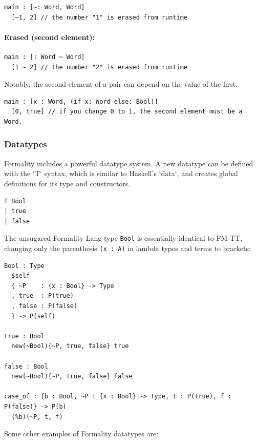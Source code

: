 \documentclass{article}
\theoremstyle{definition}
\theoremstyle{theorem}
\begin{document}
\begin{lstlisting}
main : [~: Word, Word]
  [~1, 2] // the number "1" is erased from runtime
\end{lstlisting}

\paragraph{Erased (second element):}

\begin{lstlisting}
main : [: Word ~ Word]
  [1 ~ 2] // the number "2" is erased from runtime
\end{lstlisting}

Notably, the second element of a pair can depend on the value of the first.

\begin{lstlisting}
main : [x : Word, (if x: Word else: Bool)]
  [0, true] // if you change 0 to 1, the second element must be a Word.
\end{lstlisting}


\subsubsection{Datatypes}

Formality includes a powerful datatype system. A new datatype can be defined
with the `T` syntax, which is similar to Haskell's `data`, and creates global
definitions for its type and constructors. 

\begin{lstlisting}
T Bool
| true
| false
\end{lstlisting}

The unsugared Formality Lang type \verb|Bool| is essentially identical to FM-TT,
changing only the parenthesis \verb|(x : A)| in lambda types and terms to
brackets:

\begin{lstlisting}
Bool : Type
  $self
  { ~P    : {x : Bool} -> Type
  , true  : P(true)
  , false : P(false)
  } -> P(self)

true : Bool
  new(~Bool){~P, true, false} true

false : Bool
  new(~Bool){~P, true, false} false

case_of : {b : Bool, ~P : {x : Bool} -> Type, t : P(true), f : P(false)} -> P(b)
  (%b)(~P, t, f)
\end{lstlisting}

Some other examples of Formality datatypes are:
\end{document}
